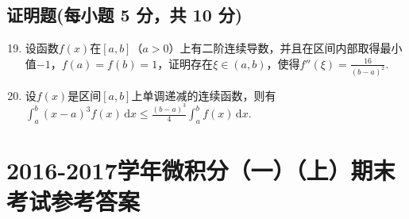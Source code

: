 \documentclass[../Main.tex]{subfiles}
\begin{document}
\section{证明题(每小题 5 分，共 10 分)}
\begin{enumerate}
    \setcounter{enumi}{18}
    \item 设函数$f(x)$在$[a,b]$（$a>0$）上有二阶连续导数，并且在区间内部取得最小值$-
              1$，$f(a)=f(b)=1$，证明存在$\xi\in(a,b)$，使得$f''(\xi)=\frac{16}{(b-a)^{2}}$.
          \vspace{15em}

    \item 设$f(x)$是区间$[a,b]$上单调递减的连续函数，则有$\int_{a}^{b}(x-a)^{3}
              f(x)\,\mathrm{d}x\leq\frac{(b-a)^{3}}{4}\int_{a}^{b}f(x)\,\mathrm{d}x$.
          \vspace{15em}
\end{enumerate}

\chapter{2016-2017学年微积分（一）（上）期末考试参考答案}
\end{document}

